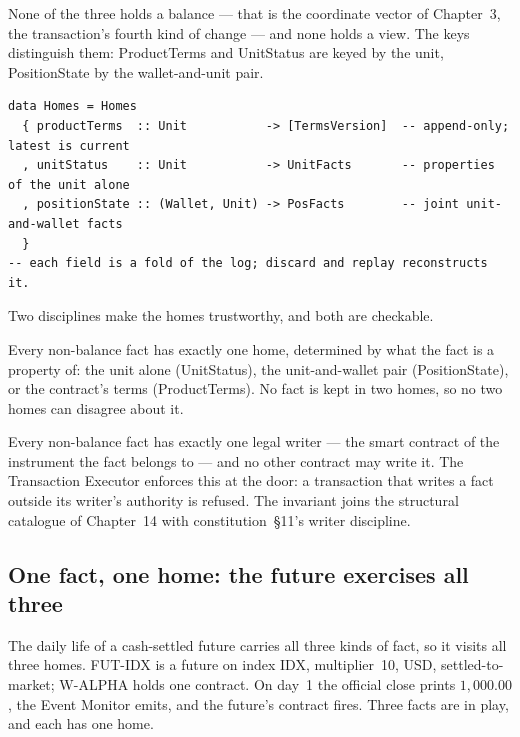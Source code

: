 None of the three holds a balance --- that is the coordinate vector of
Chapter~3, the transaction's fourth kind of change --- and none holds a
view. The keys distinguish them: ProductTerms and UnitStatus are keyed by the unit,
PositionState by the wallet-and-unit pair.

\begin{lstlisting}
data Homes = Homes
  { productTerms  :: Unit           -> [TermsVersion]  -- append-only; latest is current
  , unitStatus    :: Unit           -> UnitFacts       -- properties of the unit alone
  , positionState :: (Wallet, Unit) -> PosFacts        -- joint unit-and-wallet facts
  }
-- each field is a fold of the log; discard and replay reconstructs it.
\end{lstlisting}

Two disciplines make the homes trustworthy, and both are checkable.

\begin{principle}\label{prin:one-home}
Every non-balance fact has exactly one home, determined by what the fact is a property of:
the unit alone (UnitStatus), the unit-and-wallet pair (PositionState), or the contract's
terms (ProductTerms). No fact is kept in two homes, so no two homes can disagree about it.
\end{principle}

\begin{invariant}\label{inv:one-writer}
Every non-balance fact has exactly one legal writer --- the smart contract of the
instrument the fact belongs to --- and no other contract may write it. The Transaction
Executor enforces this at the door: a transaction that writes a fact outside its writer's
authority is refused. The invariant joins the structural catalogue of
Chapter~14 with constitution~\S 11's writer discipline.
\end{invariant}

\subsection{One fact, one home: the future exercises all three}

The daily life of a cash-settled future carries all three kinds of fact, so it visits all
three homes. FUT-IDX is a future on index IDX, multiplier~10, USD, settled-to-market;
W-ALPHA holds one contract. On day~1 the official close prints $1{,}000.00$, the Event
Monitor emits, and the future's contract fires. Three facts are in play, and each has one
home.

